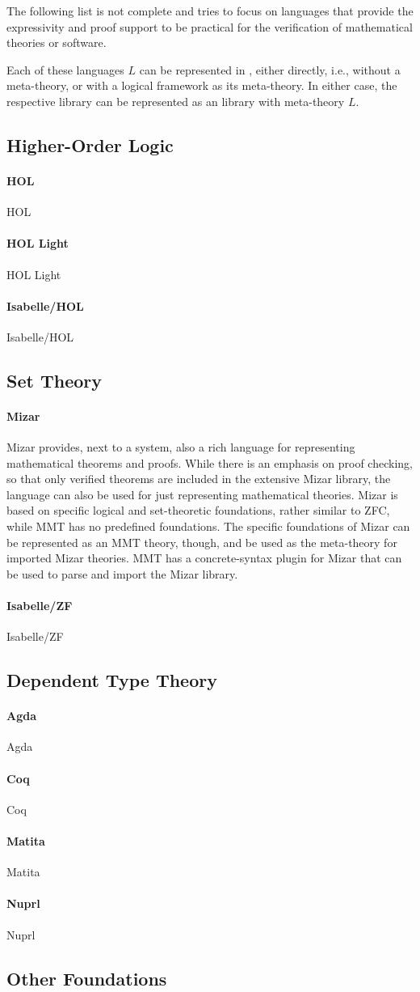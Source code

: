 \documentclass[12pt]{article}
\newcommand{\system}[2][]{\paragraph{#2}#2 \ifnonempty[\cite{#2}]{#1}{\cite{#1}}}
\begin{document}
The following list is not complete and tries to focus on languages that provide the expressivity and proof support to be practical for the verification of mathematical theories or software.

Each of these languages $L$ can be represented in \mmt, either directly, i.e., without a meta-theory, or with a logical framework as its meta-theory.
In either case, the respective library can be represented as an \mmt library with meta-theory $L$.

\subsection{Higher-Order Logic}

\system{HOL}

\system[hollight]{HOL Light}

\system[isabellehol]{Isabelle/HOL}

\subsection{Set Theory}

\system{Mizar} provides, next to a system, also a rich language for representing mathematical theorems and proofs. While there is an emphasis on proof checking, so that only verified theorems are included in the extensive Mizar library, the language can also be used for just representing mathematical theories.
Mizar is based on specific logical and set-theoretic foundations, rather similar to ZFC, while MMT has no predefined foundations. The specific foundations of Mizar can be represented as an MMT theory, though, and be used as the meta-theory for imported Mizar theories.
MMT has a concrete-syntax plugin for Mizar that can be used to parse and import the Mizar library.

\system[isabelle_zf]{Isabelle/ZF}

\subsection{Dependent Type Theory}

\system{Agda}

\system{Coq}

\system{Matita}

\system{Nuprl}

\subsection{Other Foundations}
\end{document}
